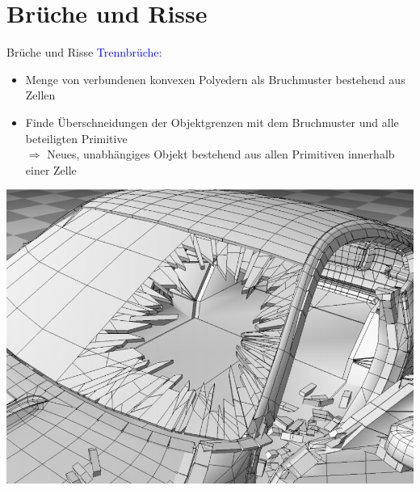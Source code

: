 \documentclass[t]{beamer}
\begin{document}
	\section{Brüche und Risse}
	\begin{frame}{Brüche und Risse}
		\textcolor{blue}{Trennbrüche:}
		\begin{itemize}
			\item Menge von verbundenen konvexen Polyedern als Bruchmuster bestehend aus Zellen
		\end{itemize}
			\begin{minipage}{0.6\textwidth}
				\begin{itemize}
					\item Finde Überschneidungen der Objektgrenzen mit dem Bruchmuster und alle beteiligten Primitive\\
					$\Rightarrow$ Neues, unabhängiges Objekt bestehend aus allen Primitiven innerhalb einer Zelle 
				\end{itemize}
			\end{minipage}\begin{minipage}{0.4\textwidth}
				\begin{center}
					\centering
					\includegraphics[scale = 0.2]{GlassFracture.png}
				\end{center}
			\end{minipage}
	\end{frame}
\end{document}
